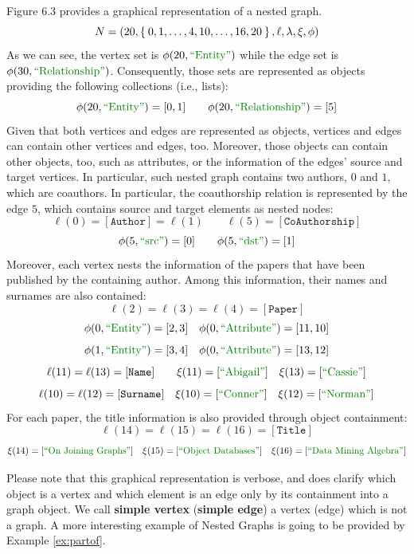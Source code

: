 \begin{example}
Figure 6.3 provides a graphical representation of a nested graph.
\[N=(20,\Set{0,1,\dots,4,10,\dots,16,20},\ell,\lambda,\xi,\phi)\]
As we can see, the vertex set is $\phi(20,\ONTA)$ while the edge set is $\phi(30,\RELA)$. Consequently, those sets are represented as objects providing the following collections (i.e., lists):
\[\phi(20,\ONTA)=[0,1]\qquad \phi(20,\RELA)=[5]\]
Given that both vertices and edges are represented as objects, vertices and edges can contain other vertices and edges, too. Moreover, those objects can contain other objects, too, such as attributes, or the information of the edges' source and target vertices. In particular, such nested graph contains two authors, $0$ and $1$, which are coauthors. 
In particular, the coauthorship relation is represented by the edge $5$, which contains source and target elements as nested nodes:
\[\ell(0)=[\texttt{Author}]=\ell(1)\qquad \ell(5)=[\texttt{CoAuthorship}]\]
\[\phi(5,\SRC)=[0]\qquad \phi(5,\DST)=[1]\]
Moreover, each vertex nests the information of the papers that have been published by the containing author. Among this information, their names and surnames are also contained:
\[ \ell(2)=\ell(3)=\ell(4)=[\texttt{Paper}]\]
\[\phi(0,\ONTA)=[2,3]\quad \phi(0,\ATTR)=[11,10]\]
\[\phi(1,\ONTA)=[3,4]\quad \phi(0,\ATTR)=[13,12]\]
\[\ell(11)=\ell(13)=[\texttt{Name}]\qquad \xi(11)=[\mstr{Abigail}]\quad \xi(13)=[\mstr{Cassie}]\]
\[\ell(10)=\ell(12)=[\texttt{Surname}]\quad \xi(10)=[\mstr{Conner}]\quad \xi(12)=[\mstr{Norman}]\]
For each paper, the title information is also provided through object containment:
\[\ell(14)=\ell(15)=\ell(16)=[\texttt{Title}]\]
\[\xi(14)=[\mstr{On Joining Graphs}]\quad \xi(15)=[\mstr{Object Databases}]\quad \xi(16)=[\mstr{Data Mining Algebra}]\]
\end{example}

Please note that this graphical representation is verbose, and does  clarify which object is a vertex and which element is an edge only by its containment into a graph object. We call \textbf{simple vertex} (\textbf{simple edge}) a vertex (edge) which is not a graph. A more interesting example of Nested Graphs is going to be provided by Example \vref{ex:partof}.



